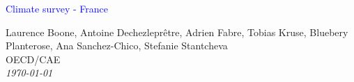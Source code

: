 



%
              





\begin{frame}
\thispagestyle{empty}
\begin{center}
\begin{LARGE}
\textcolor{blue}{Climate survey - France}
\end{LARGE}

\vspace{1cm}


Laurence Boone, Antoine Dechezleprêtre, Adrien Fabre, Tobias Kruse, Bluebery Planterose, Ana Sanchez-Chico, Stefanie Stantcheva \\

OECD/CAE \\

\textit{\today} 

\end{center}

\bigskip

\end{frame}





